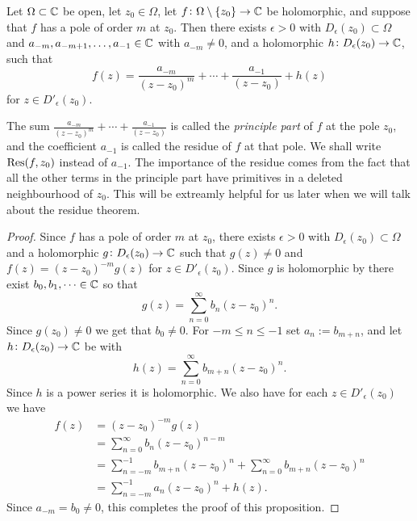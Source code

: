 \documentclass[11pt,a4paper]{article}
\begin{document}
\begin{proposition}
  \label{prop:almost-loren}
  Let $\Omega \subset \mathbb{C}$ be open,
  let $z_0 \in \Omega$,
  let $f \colon \Omega \setminus \left\{z_0\right\} \to \mathbb{C}$ be holomorphic,
  and suppose that $f$ has a pole of order $m$ at $z_0$.
  Then there exists $\epsilon > 0$ with $D_{\epsilon}(z_0) \subset \Omega$
  and $a_{-m},a_{-m+1},\dots,a_{-1} \in \mathbb{C}$ with $a_{-m} \neq 0$,
  and a holomorphic $h \colon D_{\epsilon}(z_0) \to \mathbb{C}$, such that
  \[
    f(z) =
    \frac{a_{-m}}{(z - z_0)^{m}} + \cdots +
    \frac{a_{-1}}{(z - z_0)} + h(z)
  \]
  for $z \in D'_{\epsilon}(z_0)$.
\end{proposition}
\begin{remark}
  The sum $\frac{a_{-m}}{(z - z_0)^{m}} + \cdots + \frac{a_{-1}}{(z - z_0)}$
  is called the \textit{principle part} of $f$ at the pole $z_0$,
  and the coefficient $a_{-1}$ is called the residue of $f$ at that
  pole.
  We shall write $\operatorname{Res}(f,z_0)$ instead of $a_{-1}$.
  The importance of the residue comes from the fact that
  all the other terms in the principle part have primitives in
  a deleted neighbourhood of $z_0$.
  This will be extreamly helpful for us later when we will talk about
  the residue theorem.
\end{remark}
\begin{proof}
  Since $f$ has a pole of order $m$ at $z_0$, there exists
  $\epsilon > 0$ with $D_{\epsilon}(z_0) \subset \Omega$ and a holomorphic
  $g \colon D_{\epsilon}(z_0) \to \mathbb{C}$ such that $g(z) \neq 0$ and
  $f(z) = (z - z_0)^{-m} g(z)$ for $z \in D'_{\epsilon}(z_0)$.
  Since $g$ is holomorphic by 
  there exist $b_0,b_1,\dots \in \mathbb{C}$ so that
  \[
    g(z) = \sum_{n=0}^{\infty} b_n (z - z_0)^n.
  \]
  Since $g(z_0) \neq 0$ we get that $b_0 \neq 0$.
  For $-m \le n \le -1$ set $a_n := b_{m+n}$,
  and let $h \colon D_{\epsilon}(z_0) \to \mathbb{C}$ be with
  \[
    h(z) = \sum_{n=0}^{\infty} b_{m+n} (z - z_0)^n.
  \]
  Since $h$ is a power series it is holomorphic.
  We also have for each $z \in D'_{\epsilon}(z_0)$ we have
  \begin{align*}
    f(z) &= (z - z_0)^{-m} g(z)
      \\ &= \sum_{n=0}^{\infty} b_n (z - z_0)^{n - m}
      \\ &= \sum_{n=-m}^{-1} b_{m+n} (z - z_0)^n +
            \sum_{n=0}^{\infty} b_{m+n} (z - z_0)^n
      \\ &= \sum_{n=-m}^{-1} a_n (z - z_0)^n + h(z).
  \end{align*}
  Since $a_{-m} = b_0 \neq 0$, this completes the proof of this proposition.
\end{proof}
\end{document}
